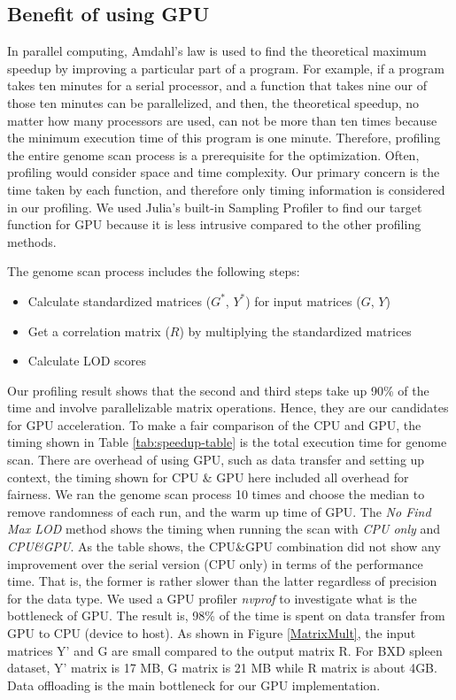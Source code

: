 \documentclass[9pt,twocolumn,twoside,lineno]{gsag3jnl}
\begin{document}
\subsection{Benefit of using GPU}
In parallel computing, Amdahl's law is used to find the theoretical maximum speedup by improving a particular part of a program.  
For example, if a program takes ten minutes for a serial processor, and a function that takes nine our of those ten minutes can be parallelized, and then, the theoretical speedup, no matter how many processors are used, can not be more than ten times because the minimum execution time of this program is one minute. 
Therefore, profiling the entire genome scan process is a prerequisite for the optimization. 
Often, profiling would consider space and time complexity. 
Our primary concern is the time taken by each function, and therefore only timing information is considered in our profiling. 
We used Julia's built-in Sampling Profiler to find our target function for GPU because it is less intrusive compared to the other profiling methods. 

The genome scan process includes the following steps:
\begin{itemize}
	\item Calculate standardized matrices ($G^{\ast}$, $Y^{\ast}$) for input matrices ($G$, $Y$)
	\item Get a correlation matrix ($R$) by multiplying the standardized matrices
	\item Calculate LOD scores 
\end{itemize}
Our profiling result shows that the second and third steps take up 90\% of the time and involve parallelizable matrix operations.  Hence, they are our candidates for GPU acceleration.
To make a fair comparison of the CPU and GPU, the timing shown in Table \ref{tab:speedup-table} is the total execution time for genome scan. 
There are overhead of using GPU, such as data transfer and setting up context, the timing shown for CPU \& GPU here included all overhead for fairness. We ran the genome scan process 10 times and choose the median to remove randomness of each run, and the warm up time of GPU.
The \textit{No Find Max LOD} method shows the timing when running the scan with \textit{CPU only} and \textit{CPU\&GPU}.
As the table shows, the CPU\&GPU combination did not show any improvement over the serial version (CPU only) in terms of the performance time.  That is, the former is rather slower than the latter regardless of precision for the data type.
We used a GPU profiler \textit{nvprof} \cite{nvprof}
to investigate what is the bottleneck of GPU. 
The result is, 98\% of the time is spent on data transfer from GPU to CPU (device to host).
As shown in Figure \ref{MatrixMult}, the input matrices Y' and G are small compared to the output matrix R.
For BXD spleen dataset, Y' matrix is 17 MB, G matrix is 21 MB
while R matrix is about 4GB. 
Data offloading is the main bottleneck for our GPU implementation. 
\end{document}
